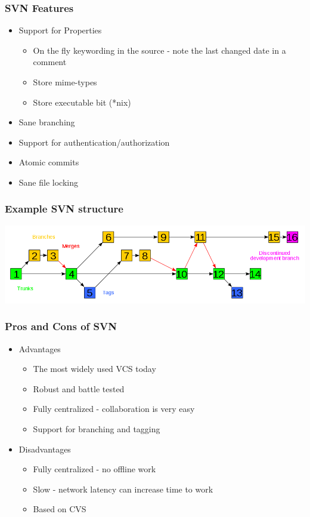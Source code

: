 \documentclass{beamer}
\begin{document}
\begin{frame}
    \frametitle{SVN Features}
    \begin{itemize}
	\item Support for Properties
	\begin{itemize}
	    \item On the fly keywording in the source - note the last changed date in a comment
	    \item Store mime-types
	    \item Store executable bit (*nix)
	\end{itemize}
    \item Sane branching
    \item Support for authentication/authorization
    \item Atomic commits
    \item Sane file locking
    \end{itemize}
\end{frame}

\begin{frame}
    \frametitle{Example SVN structure}
    \includegraphics[scale = 0.30]{images/Subversion_project_visualization.png}
\end{frame}

\begin{frame}
    \frametitle{Pros and Cons of SVN}
    \begin{itemize}
	\item Advantages
	\begin{itemize}
	    \item The most widely used VCS today
	    \item Robust and battle tested
	    \item Fully centralized - collaboration is very easy
	    \item Support for branching and tagging
	\end{itemize}
	\item Disadvantages
	\begin{itemize}
	    \item Fully centralized - no offline work
	    \item Slow - network latency can increase time to work
	    \item Based on CVS
	\end{itemize}
    \end{itemize}
\end{frame}
\end{document}
